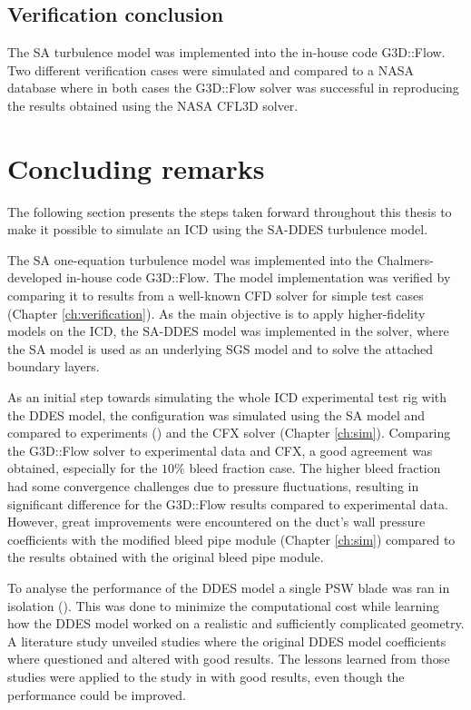 \section{Verification conclusion}
The SA turbulence model was implemented into the in-house code G3D::Flow. Two different verification cases were simulated and compared to a NASA database \cite{NASA} where in both cases the G3D::Flow solver was successful in reproducing the results obtained using the NASA CFL3D solver.
%           

\chapter{Concluding remarks\label{ch:conclusion}}
The following section presents the steps taken forward throughout this thesis to make it possible to simulate an ICD using the SA-DDES turbulence model.

The SA one-equation turbulence model was implemented into the Chalmers-developed in-house code G3D::Flow. The model implementation was verified by comparing it to results from a well-known CFD solver for simple test cases (Chapter \ref{ch:verification}). As the main objective is to apply higher-fidelity models on the ICD, the SA-DDES model was implemented in the solver, where the SA model is used as an underlying SGS model and to solve the attached boundary layers.

As an initial step towards simulating the whole ICD experimental test rig with the DDES model, the configuration was simulated using the SA model and compared to experiments () and the CFX solver (Chapter \ref{ch:sim}). Comparing the G3D::Flow solver to experimental data and CFX, a good agreement was obtained, especially for the $10\%$ bleed fraction case. The higher bleed fraction had some convergence challenges due to pressure fluctuations, resulting in significant difference for the G3D::Flow results compared to experimental data. However, great improvements were encountered on the duct’s wall pressure coefficients with the modified bleed pipe module (Chapter \ref{ch:sim}) compared to the results obtained with the original bleed pipe module.

To analyse the performance of the DDES model a single PSW blade was ran in isolation (). This was done to minimize the computational cost while learning how the DDES model worked on a realistic and sufficiently complicated geometry. A literature study unveiled studies where the original DDES model coefficients where questioned and altered with good results. The lessons learned from those studies were applied to the study in  with good results, even though the performance could be improved.

